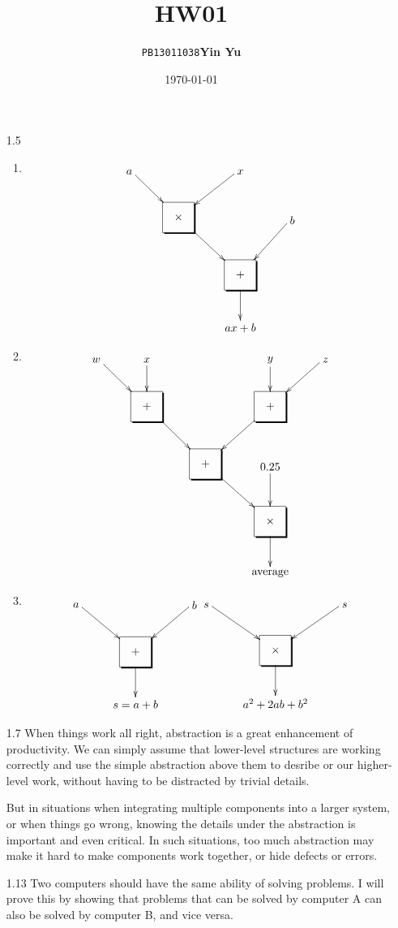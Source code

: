 \documentclass[a4paper]{article}
\title{\textbf{HW01}}
\author{\texttt{PB13011038}\quad\textbf{Yin Yu}}
\date{\today}
\begin{document}
\maketitle
\begin{enumerate}
\item[1.5]
\begin{enumerate}
\item
\[ \xymatrix{
  \txt{$a$}\ar[rd] & & \txt{$x$}\ar[ld] & \\
  & *+<2em>[F-,]\txt{$\times$} \ar[rd] & & \txt{$b$} \ar[ld] \\
  & & *+<2em>[F-,]\txt{$+$} \ar[d] & \\
  & & \txt{$ax+b$} &
}\]
\item
\[ \xymatrix{
  \txt{$w$}\ar[rd] & \txt{$x$}\ar[d] & & \txt{$y$}\ar[d] & \txt{$z$}\ar[ld] \\
  & *+<2em>[F-,]\txt{$+$} \ar[rd] & & *+<2em>[F-,]\txt{$+$} \ar[ld] & \\
  & & *+<2em>[F-,]\txt{$+$} \ar[rd] & \txt{$0.25$} \ar[d] & \\
  & & & *+<2em>[F-,]\txt{$\times$} \ar[d] & \\
  & & & \txt{average} &
} \]
\item
\[ \xymatrix{
  \txt{$a$}\ar[rd] & & \txt{$b$}\ar[ld] \\
  & *+<2em>[F-,]\txt{$+$} \ar[d] & \\
  & \txt{$s=a+b$} &
}
\xymatrix{
  \txt{$s$}\ar[rd] & & \txt{$s$}\ar[ld] \\
  & *+<2em>[F-,]\txt{$\times$} \ar[d] & \\
  & \txt{$a^2+2ab+b^2$} &
} \]
\end{enumerate}
\item[1.7] When things work all right, abstraction is a great
  enhancement of productivity. We can simply assume that lower-level
  structures are working correctly and use the simple abstraction
  above them to desribe or our higher-level work, without having to
  be distracted by trivial details.

  But in situations when integrating multiple components into a larger
  system, or when things go wrong, knowing the details under the
  abstraction is important and even critical. In such situations, too
  much abstraction may make it hard to make components work together,
  or hide defects or errors.
\item[1.13] Two computers should have the same ability of solving
  problems. I will prove this by showing that problems that can be
  solved by computer A can also be solved by computer B, and vice
  versa.


\end{enumerate}
\end{document}

